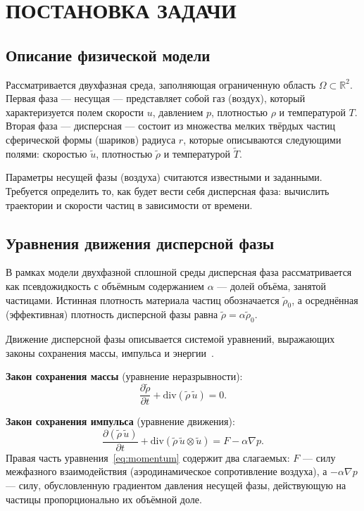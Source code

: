 \documentclass[14pt,a4paper]{extarticle}
\numberwithin{figure}{section}
\numberwithin{table}{section}
\begin{document}
\newpage
\section{ПОСТАНОВКА ЗАДАЧИ}

\subsection{Описание физической модели}

Рассматривается двухфазная среда, заполняющая ограниченную область $\Omega \subset \mathbb{R}^2$.
Первая фаза --- несущая --- представляет собой газ (воздух), который характеризуется
полем скорости $u$, давлением $p$, плотностью $\rho$ и температурой $T$.
Вторая фаза --- дисперсная --- состоит из множества мелких твёрдых частиц сферической формы
(шариков) радиуса $r$, которые описываются следующими полями:
скоростью $\tilde{u}$, плотностью $\tilde{\rho}$ и температурой $\tilde{T}$.

Параметры несущей фазы (воздуха) считаются известными и заданными. Требуется определить
то, как будет вести себя дисперсная фаза: вычислить траектории и скорости частиц в зависимости от времени.

\subsection{Уравнения движения дисперсной фазы}

В рамках модели двухфазной сплошной среды дисперсная фаза рассматривается
как псевдожидкость с объёмным содержанием $\alpha$ --- долей объёма, занятой частицами.
Истинная плотность материала частиц обозначается $\tilde{\rho}_0$, а осреднённая
(эффективная) плотность дисперсной фазы равна $\tilde{\rho} = \alpha \tilde{\rho}_0$.

Движение дисперсной фазы описывается системой уравнений, выражающих законы
сохранения массы, импульса и энергии~\cite{Nigmatulin1978}.

\textbf{Закон сохранения массы} (уравнение неразрывности):
\begin{equation}
    \frac{\partial \tilde{\rho}}{\partial t} + \mathrm{div}(\tilde{\rho}\,\tilde{u}) = 0.
    \label{eq:continuity}
\end{equation}

\textbf{Закон сохранения импульса} (уравнение движения):
\begin{equation}
    \frac{\partial(\tilde{\rho}\,\tilde{u})}{\partial t}
    + \mathrm{div}(\tilde{\rho}\,\tilde{u} \otimes \tilde{u})
    = F - \alpha \nabla p.
    \label{eq:momentum}
\end{equation}
Правая часть уравнения~\eqref{eq:momentum} содержит два слагаемых:
$F$ --- силу межфазного взаимодействия (аэродинамическое сопротивление воздуха),
а $-\alpha \nabla p$ --- силу, обусловленную градиентом давления несущей фазы,
действующую на частицы пропорционально их объёмной доле.
\end{document}
